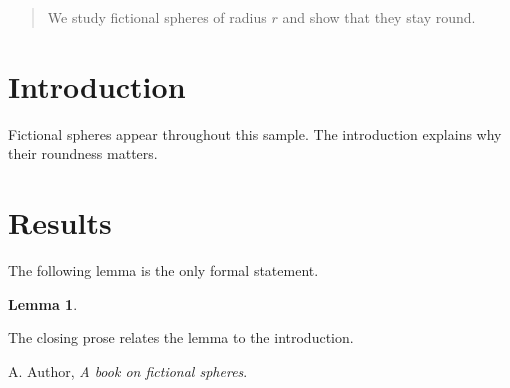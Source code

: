 \documentclass{article}
\newtheorem{lemma}{Lemma}
\begin{document}
\begin{abstract}
We study fictional spheres of radius $r$ and show that they stay round.
\end{abstract}
\section{Introduction}
Fictional spheres appear throughout this sample. The introduction explains why their roundness matters.
\section{Results}
The following lemma is the only formal statement.
\begin{lemma}

\end{lemma}
The closing prose relates the lemma to the introduction.
\begin{thebibliography}{1}
 A. Author, \emph{A book on fictional spheres}.
\end{thebibliography}
\end{document}
